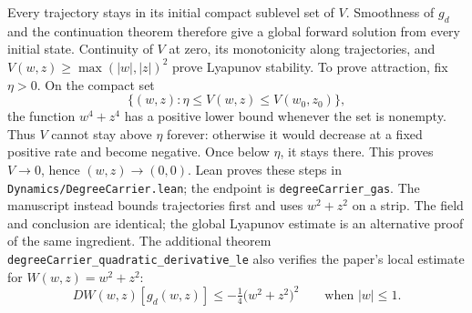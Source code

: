 \documentclass[11pt]{article}
\newcommand{\code}[1]{{\small\nolinkurl{#1}}}
\begin{document}
Every trajectory stays in its initial compact sublevel set of $V$.
Smoothness of $g_d$ and the continuation theorem therefore give a global
forward solution from every initial state. Continuity of $V$ at zero,
its monotonicity along trajectories, and
$V(w,z)\ge\max(|w|,|z|)^2$ prove Lyapunov stability. To prove attraction,
fix $\eta>0$. On the compact set
\[
 \{(w,z):\eta\le V(w,z)\le V(w_0,z_0)\},
\]
the function $w^4+z^4$ has a positive lower bound whenever the set is
nonempty. Thus $V$ cannot stay above $\eta$ forever: otherwise it would
decrease at a fixed positive rate and become negative. Once below $\eta$,
it stays there. This proves $V\to0$, hence $(w,z)\to(0,0)$.
Lean proves these steps in \code{Dynamics/DegreeCarrier.lean}; the endpoint
is \code{degreeCarrier_gas}. The manuscript instead bounds trajectories
first and uses $w^2+z^2$ on a strip. The field and conclusion are identical;
the global Lyapunov estimate is an alternative proof of the same ingredient.
The additional theorem \code{degreeCarrier_quadratic_derivative_le} also
verifies the paper's local estimate for $W(w,z)=w^2+z^2$:
\[
 DW(w,z)[g_d(w,z)]\le-\tfrac14\bigl(w^2+z^2\bigr)^2
 \qquad\text{when }|w|\le1.
\]
\end{document}

